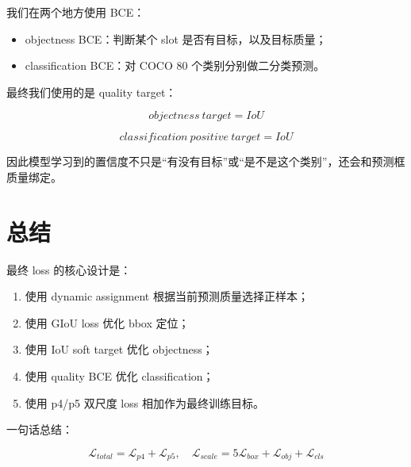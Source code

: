 \documentclass[UTF8,12pt]{ctexart}
\begin{document}
我们在两个地方使用 BCE：

\begin{itemize}[leftmargin=2em]
    \item objectness BCE：判断某个 slot 是否有目标，以及目标质量；
    \item classification BCE：对 COCO 80 个类别分别做二分类预测。
\end{itemize}

最终我们使用的是 quality target：

\[
objectness\ target = IoU
\]

\[
classification\ positive\ target = IoU
\]

因此模型学习到的置信度不只是“有没有目标”或“是不是这个类别”，还会和预测框质量绑定。

\section{总结}

最终 loss 的核心设计是：

\begin{enumerate}[leftmargin=2em]
    \item 使用 dynamic assignment 根据当前预测质量选择正样本；
    \item 使用 GIoU loss 优化 bbox 定位；
    \item 使用 IoU soft target 优化 objectness；
    \item 使用 quality BCE 优化 classification；
    \item 使用 p4/p5 双尺度 loss 相加作为最终训练目标。
\end{enumerate}

一句话总结：

\[
\boxed{
\mathcal{L}_{total}
=
\mathcal{L}_{p4}
+
\mathcal{L}_{p5},
\quad
\mathcal{L}_{scale}
=
5\mathcal{L}_{box}
+
\mathcal{L}_{obj}
+
\mathcal{L}_{cls}
}
\]
\end{document}
